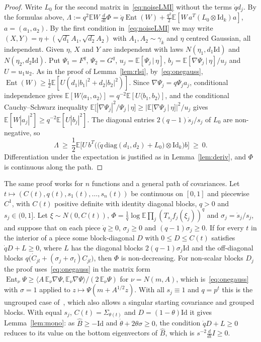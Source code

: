 \documentclass[11pt]{amsart}
\theoremstyle{definition}
\newcommand{\E}{\mathbb{E}}
\newcommand{\Ent}{\operatorname{Ent}}
\newcommand{\Id}{\mathrm{Id}}
\begin{document}
\begin{proof}
Write $L_0$ for the second matrix in~\eqref{eq:noiseLMI} without the terms $\dot qd_j$. By the formulas above,
$\Lambda:=q^2\E W\,\frac d{dt}\Phi=\dot q\Ent(W)+\frac{q^2}2\E[W\,a^T(L_0\otimes\Id_k)a]$, $a=(a_1,a_2)$. By the first
condition in~\eqref{eq:noiseLMI} we may write $(X,Y)=\eta+(\sqrt{d_1}A_1,\sqrt{d_2}A_2)$ with $A_1,A_2\sim\gamma_k$ and
$\eta$ centred Gaussian, all independent. Given $\eta$, $X$ and $Y$ are independent with laws $N(\eta_1,d_1\Id)$ and
$N(\eta_2,d_2\Id)$. Put $\Psi_1=F^q$, $\Psi_2=G^q$, $u_j=\E[\Psi_j\,|\,\eta]$, $b_j=\E[\nabla\Psi_j\,|\,\eta]/u_j$ and
$U=u_1u_2$. As in the proof of Lemma~\ref{lem:rlsi}, by~\eqref{eq:onegauss},
$\Ent(W)\ge\frac12\E[U(d_1|b_1|^2+d_2|b_2|^2)]$. Since $\nabla\Psi_j=q\Psi_ja_j$, conditional independence gives
$\E[W\langle a_1,a_2\rangle]=q^{-2}\E[U\langle b_1,b_2\rangle]$, and the conditional Cauchy--Schwarz inequality
$\E[|\nabla\Psi_j|^2/\Psi_j\,|\,\eta]\ge|\E[\nabla\Psi_j\,|\,\eta]|^2/u_j$ gives $\E[W|a_j|^2]\ge q^{-2}\E[U|b_j|^2]$. The
diagonal entries $2(q-1)\dot s_j/s_j$ of $L_0$ are non-negative, so
\[
\Lambda\ \ge\ \frac12\E\Big[U\,b^T\Big(\big(\dot q\,\mathrm{diag}(d_1,d_2)+L_0\big)\otimes\Id_k\Big)b\Big]\ \ge\ 0 .
\]
Differentiation under the expectation is justified as in Lemma~\ref{lem:deriv}, and $\Phi$ is continuous along the
path.
\end{proof}

The same proof works for $n$ functions and a general path of covariances. Let
$t\mapsto(C(t),q(t),s_1(t),\dots,s_n(t))$ be continuous on $[0,1]$ and piecewise $C^1$, with $C(t)$ positive definite
with identity diagonal blocks, $q>0$ and $s_j\in(0,1]$. Let $\xi\sim N(0,C(t))$,
$\Phi=\frac1q\log\E\prod_j(T_{s_j}f_j(\xi_j))^q$ and $\sigma_j=\dot s_j/s_j$, and suppose that on each piece $\dot q\ge0$,
$\sigma_j\ge0$ and $(q-1)\sigma_j\ge0$. If for every $t$ in the interior of a piece some block-diagonal $D$ with
$0\le D\le C(t)$ satisfies $\dot qD+L\ge0$, where $L$ has the diagonal blocks $2(q-1)\sigma_j\Id$ and the off-diagonal
blocks $q\big(\dot C_{jl}+(\sigma_j+\sigma_l)C_{jl}\big)$, then $\Phi$ is non-decreasing. For non-scalar blocks $D_j$ the
proof uses~\eqref{eq:onegauss} in the matrix form $\Ent_\nu\Psi\ge\langle A\,\E_\nu\nabla\Psi,\E_\nu\nabla\Psi\rangle/(2\,\E_\nu\Psi)$
for $\nu=N(m,A)$, which is~\eqref{eq:onegauss} with $\sigma=1$ applied to $z\mapsto\Psi(m+A^{1/2}z)$. With all
$s_j\equiv1$ and $q=p^t$ this is the ungrouped case of~\cite[Thm.~4.1]{GC}, which also allows a singular starting
covariance and grouped blocks. With equal $s_j$, $C(t)=\Sigma_{\theta(t)}$ and $D=(1-\theta)\Id$ it gives
Lemma~\ref{lem:mono}: as $\widehat B\ge-\Id$ and $\dot\theta+2\theta\sigma\ge0$, the condition $\dot qD+L\ge0$ reduces to
its value on the bottom eigenvectors of $\widehat B$, which is $s^{-2}\frac d{dt}I\ge0$.
\end{document}
